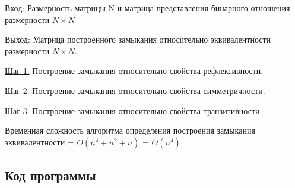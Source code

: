 \documentclass[bachelor, och, labwork]{shiza}
\begin{document}
	$\textit{Вход:}$ Размерность матрицы N и матрица представления бинарного отношения размерности $N \times N$
	
	$\textit{Выход:}$  Матрица построенного замыкания относительно эквивалентности размерности $N \times N$.
	
	\underline{Шаг 1.} Построение замыкания относительно свойства рефлексивности.
	
	\underline{Шаг 2.} Построение замыкания относительно свойства симметричности.
		
	\underline{Шаг 3.} Построение замыкания относительно свойства транзитивности.
	
	Временная сложность алгоритма определения построения замыкания эквивалентности = $O(n^4 + n^2 + n)$ = $O(n^4)$
		
	
	
	\subsection{Код программы}		
	
\end{document}
